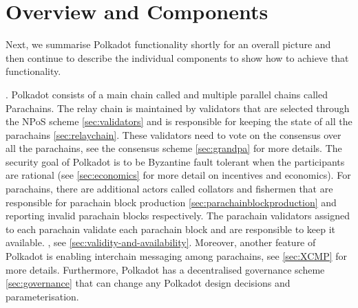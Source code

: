 \section{Overview and Components}\label{sec:components}
Next, we summarise Polkadot functionality shortly for an overall picture and then continue to describe the individual components to show how to achieve that functionality.

. Polkadot consists of a main chain called  and multiple parallel chains
called Parachains. The relay chain is maintained by validators that are selected through the NPoS scheme \ref{sec:validators} and is responsible for  keeping the state of all the parachains \ref{sec:relaychain}.
These validators need to vote on the consensus over all the parachains, see the consensus scheme \ref{sec:grandpa} for more details.
The security goal of Polkadot is to be Byzantine fault tolerant when the participants are rational (see \ref{sec:economics} for more detail on incentives and economics).
For parachains, there are additional actors called collators and fishermen that are responsible for parachain block production \ref{sec:parachainblockproduction} and reporting invalid parachain blocks respectively.
The parachain validators assigned to each parachain validate each parachain block and are responsible to keep it available. , see \ref{sec:validity-and-availability}. Moreover, another feature of Polkadot is enabling interchain messaging among parachains, see \ref{sec:XCMP} for more details.
Furthermore, Polkadot has a decentralised governance scheme \ref{sec:governance} that can change any Polkadot design decisions and parameterisation.








